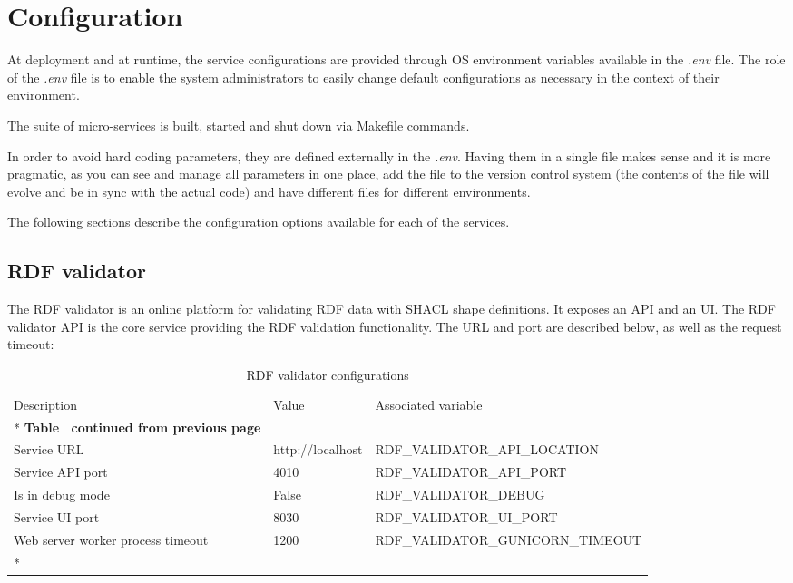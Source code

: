 \section{Configuration}
\label{sec:configuration}
At deployment and at runtime, the service configurations are provided through OS environment variables available in the \textit{.env} file. The role of the \textit{.env} file is to enable the system administrators to easily change default configurations as necessary in the context of their environment.

The suite of micro-services is built, started and shut down via Makefile commands.

In order to avoid hard coding parameters, they are defined externally in the \textit{.env}. Having them in a single file makes  sense and it is more pragmatic, as you can see and manage all parameters in one place, add the file to the version control system (the contents of the file will evolve and be in sync with the actual code) and have different files for different environments.

The following sections describe the configuration options available for each of the services.

\subsection{RDF validator}

The RDF validator is an online platform for validating RDF data with SHACL shape definitions. It exposes an API and an UI. The RDF validator API is the core service providing the RDF validation functionality. The URL and port are described below, as well as the request timeout:

\begin{longtable}[c]{@{}p{3.5cm}p{3.5cm}l@{}}
	\toprule
	Description                       & Value            & Associated variable               \\* \midrule
	\endfirsthead
	\multicolumn{3}{c}%
	{{\bfseries Table \thetable\ continued from previous page}}                              \\
	\endhead
	\bottomrule
	\endfoot
	\endlastfoot
	Service URL                       & http://localhost & RDF\_VALIDATOR\_API\_LOCATION     \\
	Service API port                  & 4010             & RDF\_VALIDATOR\_API\_PORT         \\
	Is in debug mode                  & False            & RDF\_VALIDATOR\_DEBUG             \\
	Service UI port                   & 8030             & RDF\_VALIDATOR\_UI\_PORT          \\
	Web server worker process timeout & 1200             & RDF\_VALIDATOR\_GUNICORN\_TIMEOUT \\* \bottomrule
	\caption{RDF validator configurations}
	\label{tab:rdf-validator-configuration}                                                  \\
\end{longtable}


